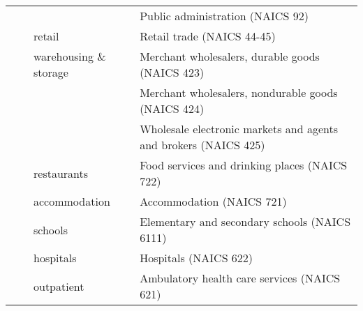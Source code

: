 \begin{longtable}{l l l l}
        & &  & Public administration (NAICS 92)\\
        & & retail & Retail trade (NAICS 44-45) \\
        & & warehousing \& storage  & Merchant wholesalers, durable goods (NAICS 423)\\
         & &  & Merchant wholesalers, nondurable goods (NAICS 424)\\
         & &  & Wholesale electronic markets and agents and brokers (NAICS 425)\\
        & & restaurants & Food services and drinking places (NAICS 722) \\
        & & accommodation & Accommodation (NAICS 721) \\
        & & schools & Elementary and secondary schools (NAICS 6111) \\
        & & hospitals & Hospitals (NAICS 622) \\
        & & outpatient & Ambulatory health care services (NAICS 621) \\
    \bottomrule
    
\end{longtable}